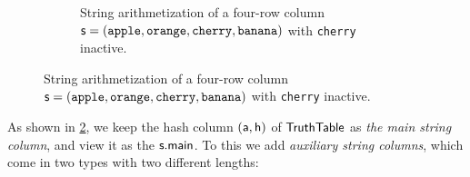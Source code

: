 \begin{figure}[tp]
\begin{figure}[h!]
\caption{String arithmetization of a four-row column
$\mathsf{s}=(\texttt{apple},\texttt{orange},\texttt{cherry},\texttt{banana})$ with
\texttt{cherry} inactive.}
\label{fig:string-arith-example}
\ifsp\end{figure}\else\end{figure}\fi



As shown in \cref{fig:string-arith-example}, we keep the hash column $(\mathsf{a},\mathsf{h})$ of $\mathsf{TruthTable}$ as \emph{the main string column}, and view it as the $\mathsf{s}.\mathsf{main}$. To this we add \emph{auxiliary string columns}, which come in two types with two different lengths:

